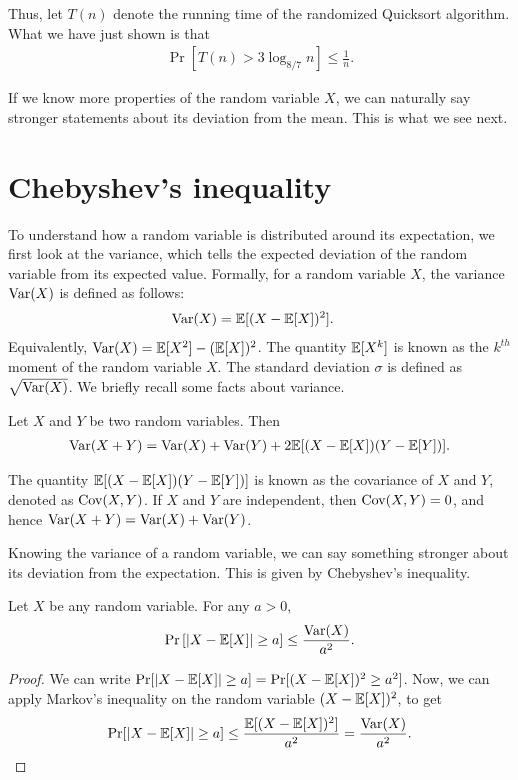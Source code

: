 Thus, let $T(n)$ denote the running time of the randomized Quicksort algorithm. What we have just shown is that
\begin{align*}
	\Pr[T(n) > 3\log_{8/7}n] \leq \frac{1}{n}.
\end{align*}

If we know more properties of the random variable $X$, we can naturally say stronger statements about its deviation from the mean. This is what we see next.

\section{Chebyshev's inequality}

To understand how a random variable is distributed around its expectation, we first look at the variance, which tells the expected deviation of the random variable from its expected value. Formally, for a random variable $X$, the variance $\operatorname{Var}(X)$ is defined as follows:
\begin{align*}
	\operatorname{Var}(X) &= \mathbb{E}[(X - \mathbb{E}[X])^2].
\end{align*}
Equivalently, $\operatorname{Var}(X) = \mathbb{E}[X^2] - (\mathbb{E}[X])^2$. The quantity $\mathbb{E}[X^k]$ is known as the $k^{th}$ moment of the random variable $X$. The standard deviation $\sigma$ is defined as $\sqrt{\operatorname{Var}(X)}$. We briefly recall some facts about variance.

\begin{fact}
	Let $X$ and $Y$ be two random variables. Then
	\begin{align*}
		\operatorname{Var}(X+Y) = \operatorname{Var}(X) + \operatorname{Var}(Y) + 2\mathbb{E}[(X-\mathbb{E}[X])(Y-\mathbb{E}[Y])].
	\end{align*}
\end{fact} 
The quantity $\mathbb{E}[(X-\mathbb{E}[X])(Y-\mathbb{E}[Y])]$ is known as the covariance of $X$ and $Y$, denoted as $\operatorname{Cov}(X,Y)$. If $X$ and $Y$ are independent, then $\operatorname{Cov}(X,Y) =0$, and hence $\operatorname{Var}(X+Y) = \operatorname{Var}(X) + \operatorname{Var}(Y)$.

Knowing the variance of a random variable, we can say something stronger about its deviation from the expectation. This is given by Chebyshev's inequality.
\begin{theorem}
	Let $X$ be any random variable. For any $a > 0$, 
	\begin{align*}
		\Pr\left[ |X-\mathbb{E}[X]| \geq a \right] \leq \frac{\operatorname{Var}(X)}{a^2}.
	\end{align*}
	\label{thm:chebyshev}
\end{theorem}
\begin{proof}
	We can write $\Pr[|X-\mathbb{E}[X]| \geq a] = \Pr[(X-\mathbb{E}[X])^2 \geq a^2]$. Now, we can apply Markov's inequality on the random variable $(X-\mathbb{E}[X])^2$, to get
	\begin{align*}
		\Pr[|X - \mathbb{E}[X]| \geq a] \leq \frac{\mathbb{E}[(X-\mathbb{E}[X])^2]}{a^2} = \frac{\operatorname{Var}(X)}{a^2}.
	\end{align*}
\end{proof}

